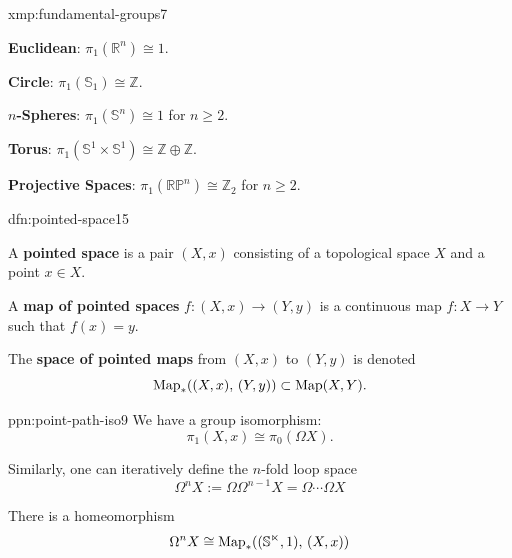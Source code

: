 \documentclass[landscape, 8pt]{extarticle}
\begin{document}
\begin{multicols*}{3}
\vspace{-7pt}
\begin{xmp}{xmp:fundamental-groups}{7}
	\vspace{-2pt}
	\begin{itemize-tight}
	    \item \textbf{Euclidean}: $\pi_{1}(\mathbb{R}^{n}) \cong 1$.
	    \item \textbf{Circle}: $\pi_{1}(\mathbb{S}_{1}) \cong \mathbb{Z}$.
	    \item \textbf{$n$-Spheres}: $\pi_{1}(\mathbb{S}^{n}) \cong 1$ for $n \ge 2$.
	    \item \textbf{Torus}: $\pi_{1}(\mathbb{S}^{1} \times \mathbb{S}^{1}) \cong \mathbb{Z} \oplus \mathbb{Z}$.
	    \item \textbf{Projective Spaces}: $\pi_{1}(\mathbb{RP}^{n}) \cong \mathbb{Z}_{2}$ for $n \ge 2$.
	\end{itemize-tight}
\end{xmp}

\vspace{-7pt}
\begin{dfn}{dfn:pointed-space}{15}
	\vspace{-2pt}
	\begin{itemize-zero}
	    \item A \textbf{pointed space} is a pair $(X, x)$ consisting of a topological space $X$ and a point $x\in X$.
	\vspace{-2pt}
	    \item A \textbf{map of pointed spaces} $f : (X, x) \to (Y, y)$ is a continuous map $f : X \to Y$ such that $f(x) = y$.
	\vspace{-2pt}
	    \item The \textbf{space of pointed maps} from $(X, x)$ to $(Y, y)$ is denoted
			\[\operatorname{Map}_{\ast}((X, x),\, (Y, y)) \subset \operatorname{Map}(X, Y).\]
	\end{itemize-zero}
\end{dfn}

\vspace{-7pt}
\begin{ppn}{ppn:point-path-iso}{9}
	\vspace{-2pt}
	We have a group isomorphism:
	\[\pi_{1}(X, x) \cong \pi_{0}(\Omega X).\]
	\par\vspace{-2pt}
	Similarly, one can iteratively define the $n$-fold loop space
	\[\Omega^{n}X := \Omega \Omega^{n-1}X = \Omega \cdots \Omega X\]
	\par\vspace{-2pt}
	There is a homeomorphism
	\[\Omega^{n}X \cong \operatorname{Map}_{\ast}((\mathbb{S^{n}}, 1),\,(X, x))\]
\end{ppn}


\end{multicols*}
\end{document}
